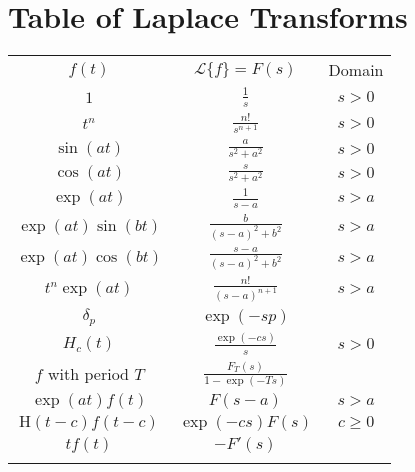 \documentclass[11pt]{article}
\begin{document}
\section*{Table of Laplace Transforms}
\begin{center}
\begin{tabular}{c c c} \hline\vspace{.2cm}
$f(t)$ & $\displaystyle\mathcal{L}\{f\} = F(s)$ & Domain \\ \vspace{.2cm}
$1$ & $\displaystyle\frac{1}{s}$ & $s > 0$ \\ \vspace{.2cm}
$t^n$ & $\displaystyle \frac{n!}{s^{n+1}}$ & $s > 0$ \\ \vspace{.2cm}
$\sin(at)$ & $\displaystyle \frac{a}{s^2 + a^2}$ & $s > 0$ \\ \vspace{.2cm}
$\cos(at)$ & $\displaystyle \frac{s}{s^2 + a^2}$ & $s > 0$ \\ \vspace{.2cm}
$\exp(at)$ & $\displaystyle \frac{1}{s - a}$ & $s > a$ \\ \vspace{.2cm}
$\exp(at)\sin(bt)$ & $\displaystyle \frac{b}{(s-a)^2 + b^2}$ & $s > a$ \\ \vspace{.2cm}
$\exp(at)\cos(bt)$ & $\displaystyle \frac{s-a}{(s-a)^2 + b^2}$ & $s > a$ \\ \vspace{.2cm}
$t^n\exp(at)$ & $\displaystyle \frac{n!}{(s-a)^{n+1}}$ & $s > a$ \\ \vspace{.2cm}
$\delta_p$ & $\exp(-sp)$ & \\ \vspace{.2cm}
$H_c(t)$ & $\displaystyle \frac{\exp(-cs)}{s}$ & $s > 0$ \\ \vspace{.2cm}
$f$ with period $T$ & $\displaystyle \frac{F_T(s)}{1 - \exp(-Ts)}$ & \\ \hline \vspace{.2cm}
$\exp(at)f(t)$ & $F(s - a)$ & $s > a$ \\ \vspace{.2cm}
$\mathrm{H}(t-c)f(t-c)$ & $\exp(-cs)F(s)$ & $c \ge 0$ \\ \vspace{.2cm}
$tf(t)$ & $-F'(s)$ & \\ \vspace{.2cm}

\end{tabular}
\end{center}
\end{document}
